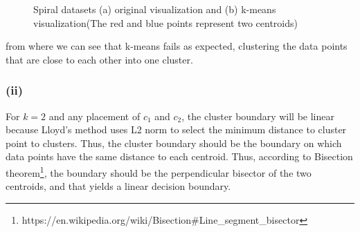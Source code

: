 \documentclass[]{homework}
\begin{document}
\begin{figure}[h!]
\centering
{}%
\label{figure2a}
\hfil
{}%
\label{figure2b}
\caption{Spiral datasets (a) original visualization and (b) k-means visualization(The red and blue points represent two centroids)}
\end{figure}\par
from where we can see that k-means fails as expected, clustering the data points that are close to each other into one cluster.
\subsubsection*{(ii)}
For $k = 2$ and any placement of $c_1$ and $c_2$, the cluster boundary will be linear because Lloyd's method uses L2 norm to select the minimum distance to cluster point to clusters. Thus, the cluster boundary should be the boundary on which data points have the same distance to each centroid. Thus, according to Bisection theorem\footnote{https://en.wikipedia.org/wiki/Bisection\#Line\_segment\_bisector}, the boundary should be the perpendicular bisector of the two centroids, and that yields a linear decision boundary.
\end{document}
